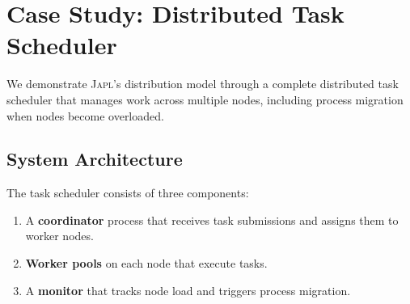 \documentclass[11pt,a4paper]{article}
\newcommand{\japl}{\textsc{Japl}}
\begin{document}
\section{Case Study: Distributed Task Scheduler}
\label{sec:case-study}

We demonstrate \japl{}'s distribution model through a complete distributed
task scheduler that manages work across multiple nodes, including process
migration when nodes become overloaded.

\subsection{System Architecture}

The task scheduler consists of three components:
\begin{enumerate}[nosep]
  \item A \textbf{coordinator} process that receives task submissions and
        assigns them to worker nodes.
  \item \textbf{Worker pools} on each node that execute tasks.
  \item A \textbf{monitor} that tracks node load and triggers process
        migration.
\end{enumerate}
\end{document}
